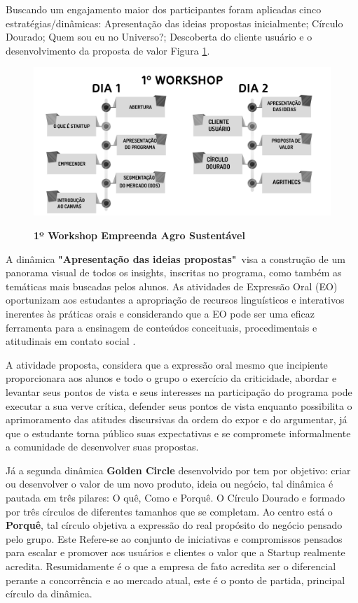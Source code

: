 Buscando um engajamento maior dos participantes foram
aplicadas cinco estratégias/dinâmicas: Apresentação das ideias propostas inicialmente; Círculo Dourado;
Quem sou eu no Universo?; Descoberta do cliente usuário e o  desenvolvimento da proposta de valor Figura \ref{figura_30}.

\begin{figure}[!h]
\centering
\caption{\textbf{1º Workshop Empreenda Agro Sustentável}}
\includegraphics[scale=0.3]{Imagens/workshop-01.png}
\label{figura_30}
\end{figure}

A dinâmica \textbf{"Apresentação das ideias propostas"}\ visa a construção de um panorama visual de todos os insights, inscritas no programa, como também as temáticas mais buscadas pelos alunos. As atividades de Expressão Oral (EO) oportunizam aos estudantes a apropriação de recursos linguísticos e interativos inerentes às práticas orais e considerando que a EO pode ser uma eficaz ferramenta para a ensinagem de conteúdos conceituais, procedimentais e atitudinais em contato social \cite{baltar_genero_2010}.

A atividade proposta, considera que a expressão oral mesmo que incipiente proporcionara aos alunos e todo o grupo o exercício da criticidade, abordar e levantar seus pontos de vista e seus interesses na participação do programa pode executar a sua verve crítica, defender seus pontos de vista enquanto possibilita o aprimoramento das atitudes discursivas da ordem do expor e do argumentar, já que o estudante torna público suas expectativas e se compromete informalmente a comunidade de desenvolver suas propostas. 

Já a segunda dinâmica \textbf{Golden Circle} desenvolvido por  tem por objetivo: criar ou desenvolver o valor de um novo produto, ideia ou negócio, tal dinâmica é pautada em três pilares: O quê, Como e Porquê. O Círculo Dourado e formado por três círculos de diferentes tamanhos que se completam. Ao centro está o \textbf{Porquê}, tal círculo objetiva a expressão do real propósito do negócio pensado pelo grupo. Este Refere-se ao conjunto de iniciativas e compromissos pensados para escalar e promover aos usuários e clientes o valor que a Startup realmente acredita. Resumidamente é o que a empresa de fato acredita ser o  diferencial perante a concorrência e ao mercado atual, este é o ponto de partida, principal círculo da dinâmica. 


